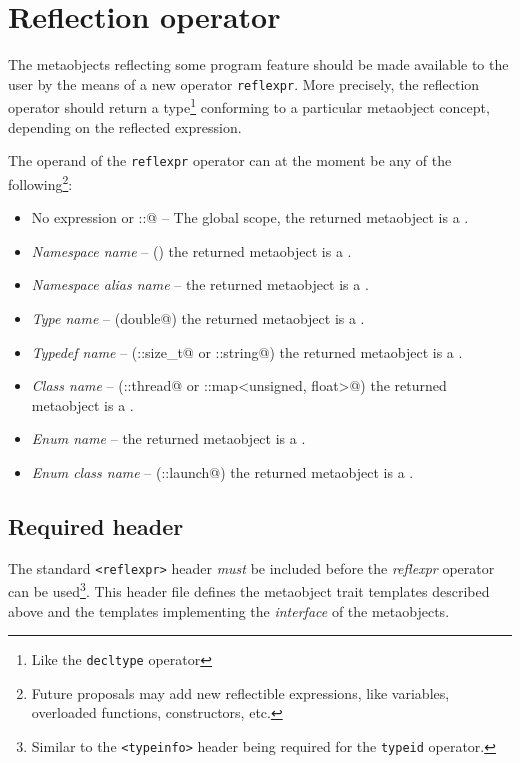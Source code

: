 \section{Reflection operator}
\label{section-reflection-operator}

The metaobjects reflecting some program feature \verb@X@ 
should be made available to the user by
the means of a new operator \texttt{reflexpr}.
More precisely, the reflection operator should return
a type\footnote{Like the \texttt{decltype} operator} conforming to a particular
metaobject concept, depending on the reflected expression.

The operand \verb@X@ of the \texttt{reflexpr} operator can at the moment
be any of the following\footnote{Future proposals may add new reflectible expressions,
like variables, overloaded functions, constructors, etc.}:

\begin{itemize}
\item{No expression or \verb@::@} -- The global scope, the returned metaobject is a {}.
\item{{\em Namespace name}} -- (\verb@std@) the returned metaobject is a {}.
\item{{\em Namespace alias name}} -- the returned metaobject is a {}.
\item{{\em Type name}} -- (\verb@long double@) the returned metaobject is a {}.
\item{{\em Typedef name}} -- (\verb@std::size_t@ or \verb@std::string@)
     the returned metaobject is a {}.
\item{{\em Class name}} -- (\verb@std::thread@ or \verb@std::map<unsigned, float>@)
     the returned metaobject is a {}.
\item{{\em Enum name}} -- 
     the returned metaobject is a {}.
\item{{\em Enum class name}} -- (\verb@std::launch@)
     the returned metaobject is a {}.
\end{itemize}

\subsection{Required header}
\label{section-reflexpr-header}

The standard \texttt{<reflexpr>} header \emph{must} be included before
the \emph{reflexpr} operator can be used\footnote{Similar to the
\texttt{<typeinfo>} header being required for the \texttt{typeid} operator.}.
This header file defines the metaobject trait templates described above
and the templates implementing the \emph{interface} of the metaobjects.

